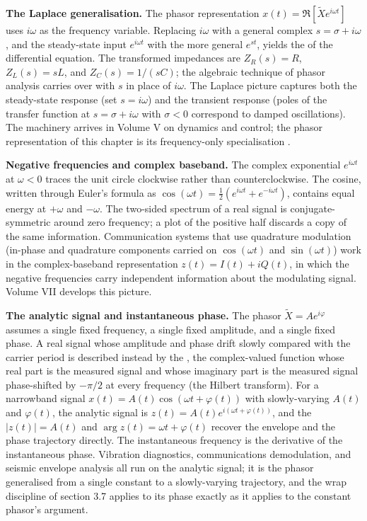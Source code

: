 \begin{mastery}
\textbf{The Laplace generalisation.} The phasor representation
$x(t) = \Re[\tilde X e^{i\omega t}]$ uses $i\omega$ as the
frequency variable. Replacing $i\omega$ with a general complex
$s = \sigma + i\omega$, and the steady-state input $e^{i\omega t}$
with the more general $e^{s t}$, yields the  of the differential equation. The transformed impedances
are $Z_{R}(s) = R$, $Z_{L}(s) = s L$, and $Z_{C}(s) = 1/(s C)$; the
algebraic technique of phasor analysis carries over with $s$ in
place of $i\omega$. The Laplace picture captures both the
steady-state response (set $s = i\omega$) and the transient
response (poles of the transfer function at $s = \sigma + i\omega$
with $\sigma < 0$ correspond to damped oscillations). The
machinery arrives in Volume V on dynamics and control; the phasor
representation of this chapter is its frequency-only specialisation
\cite{text:v2ch03-nilsson-riedel}.

\textbf{Negative frequencies and complex baseband.} The complex
exponential $e^{i\omega t}$ at $\omega < 0$ traces the unit circle
clockwise rather than counterclockwise. The cosine, written through
Euler's formula as $\cos(\omega t) = \tfrac{1}{2}(e^{i\omega t} +
e^{-i\omega t})$, contains equal energy at $+\omega$ and
$-\omega$. The two-sided spectrum of a real signal is
conjugate-symmetric around zero frequency; a plot of the
positive half discards a copy of the same information. Communication
systems that use quadrature modulation (in-phase and quadrature
components carried on $\cos(\omega t)$ and $\sin(\omega t)$) work
in the complex-baseband representation $z(t) = I(t) + i Q(t)$, in
which the negative frequencies carry independent information about
the modulating signal. Volume VII develops this picture.
\end{mastery}

\begin{mastery}
\textbf{The analytic signal and instantaneous phase.} The phasor
$\tilde X = A e^{i\varphi}$ assumes a single fixed frequency, a
single fixed amplitude, and a single fixed phase. A real signal whose
amplitude and phase drift slowly compared with the carrier period is
described instead by the , the
complex-valued function whose real part is the measured signal and
whose imaginary part is the measured signal phase-shifted by
$-\pi/2$ at every frequency (the Hilbert transform). For a narrowband
signal $x(t) = A(t)\cos(\omega t + \varphi(t))$ with slowly-varying
$A(t)$ and $\varphi(t)$, the analytic signal is $z(t) = A(t)
e^{i(\omega t + \varphi(t))}$, and the  $|z(t)| = A(t)$ and 
$\arg z(t) = \omega t + \varphi(t)$ recover the envelope and the
phase trajectory directly. The instantaneous frequency is the
derivative of the instantaneous phase. Vibration diagnostics,
communications demodulation, and seismic envelope analysis all run on
the analytic signal; it is the phasor generalised from a single
constant to a slowly-varying trajectory, and the wrap discipline of
section 3.7 applies to its phase exactly as it applies to the
constant phasor's argument.
\end{mastery}

